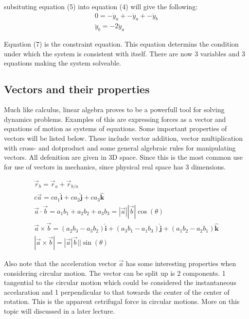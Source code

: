 \documentclass[11pt, a4paper]{article}
\begin{document}
subsituting equation (5) into equation (4) will give the following:
\begin{gather}
    0 = -\ddot{y}_a +  -\ddot{y}_a +  -\ddot{y}_b\\
    \ddot{y}_b = -2\ddot{y}_a
\end{gather}

Equation (7) is the constraint equation. This equation determins the condition under which
the system is consistent with itself. There are now 3 variables and 3 equations making the system solveable.


\subsection{Vectors and their properties}
Much like calculus, linear algebra proves to be a powerfull tool for solving dynamics problems.
Examples of this are expressing forces as a vector and equations of motion as systems of equations.
Some important properties of vectors will be listed below. These include vector addition, vector multiplication 
with cross- and dotproduct and some general algebraic rules for manipulating vectors. All defenition are given in 3D space.
Since this is the most common use for use of vectors in mechanics, since physical real space has 3 dimensions.

\setcounter{equation}{0}
\begin{gather}
    \vec{r}_b = \vec{r}_a + \vec{r}_{b/a} \\
    c \vec{a} = ca_1\boldsymbol{\hat{i}} + ca_2\boldsymbol{\hat{j}} + ca_3\boldsymbol{\hat{k}}\\
    \vec{a} \cdot \vec{b} = a_1 b_1 + a_2 b_2 + a_3 b_3 = |\vec{a}||\vec{b}|\cos(\theta)\\
    \vec{a} \times \vec{b} = (a_2 b_3 - a_3b_2) \boldsymbol{\hat{i}} + (a_3 b_1 - a_1 b_3)\boldsymbol{\hat{j}} + (a_1 b_2 - a_2 b_1)\boldsymbol{\hat{k}}\\
    |\vec{a} \times \vec{b}| = |\vec{a}|\vec{b}||\sin(\theta)
\end{gather}

Also note that the acceleration vector $\vec{a}$ has some interesting properties when considering
circular motion. The vector can be split up is 2 components. 1 tangential to the circular motion
which could be considered the instantaneous accelaration and 1 perpendicular to that towards the center
of the center of rotation. This is the apparent cetrifugal force in circular motions. More on this topic will 
discussed in a later lecture.
\newpage
\end{document}
